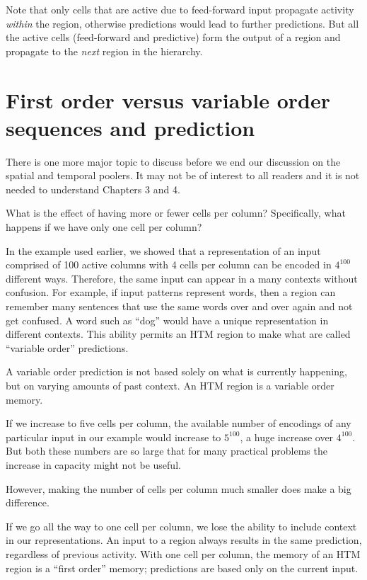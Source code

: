 \documentclass{report}
\begin{document}
Note that only cells that are active due to feed-forward input
propagate activity {\em within} the region, otherwise predictions
would lead to further predictions. But all the active cells
(feed-forward and predictive) form the output of a region and
propagate to the {\em next} region in the hierarchy.

\section*{First order versus variable order sequences and prediction}

There is one more major topic to discuss before we end our discussion
on the spatial and temporal poolers. It may not be of interest to all
readers and it is not needed to understand Chapters 3 and 4.

What is the effect of having more or fewer cells per column?
Specifically, what happens if we have only one cell per column?

In the example used earlier, we showed that a representation of an
input comprised of 100 active columns with 4 cells per column can be
encoded in $4^{100}$ different ways. Therefore, the same input can
appear in a many contexts without confusion. For example, if input
patterns represent words, then a region can remember many sentences
that use the same words over and over again and not get confused. A
word such as ``dog'' would have a unique representation in different
contexts. This ability permits an HTM region to make what are called
``variable order'' predictions.

A variable order prediction is not based solely on what is currently
happening, but on varying amounts of past context. An HTM region is a
variable order memory.

If we increase to five cells per column, the available number of
encodings of any particular input in our example would increase to
$5^{100}$, a huge increase over $4^{100}$. But both these numbers are
so large that for many practical problems the increase in capacity
might not be useful.

However, making the number of cells per column much smaller does make
a big difference.

If we go all the way to one cell per column, we lose the ability to
include context in our representations. An input to a region always
results in the same prediction, regardless of previous activity. With
one cell per column, the memory of an HTM region is a ``first order''
memory; predictions are based only on the current input.
\end{document}
